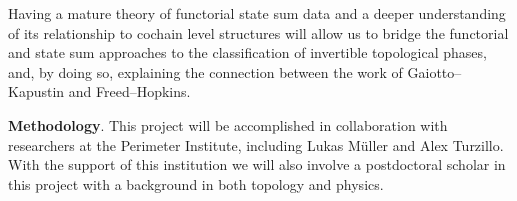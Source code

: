 Having a mature theory of functorial state sum data and a deeper understanding of its relationship to cochain level structures will allow us to bridge the functorial and state sum approaches to the classification of invertible topological phases, and, by doing so, explaining the connection between the work of Gaiotto--Kapustin and Freed--Hopkins.

\medskip\noindent\textbf{Methodology}.
This project will be accomplished in collaboration with researchers at the Perimeter Institute, including Lukas M\"uller and Alex Turzillo.
With the support of this institution we will also involve a postdoctoral scholar in this project with a background in both topology and physics.



%
%

%

